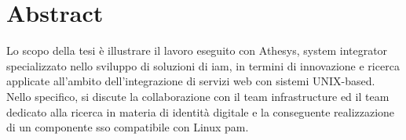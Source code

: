 
\cleardoublepage
{}
{}
\begingroup
\let\clearpage\relax
\let\cleardoublepage\relax
\let\cleardoublepage\relax

\chapter*{Abstract}

Lo scopo della tesi è illustrare il lavoro eseguito con Athesys, system integrator specializzato nello sviluppo di soluzioni di \acrfull{iam}, in termini di innovazione e ricerca applicate all'ambito dell'integrazione di servizi web con sistemi UNIX-based. Nello specifico, si discute la collaborazione con il team infrastructure ed il team dedicato alla ricerca in materia di identità digitale e la conseguente realizzazione di un componente \acrfull{sso} compatibile con Linux \acrfull{pam}. ​

%
%

\endgroup			

\vfill

